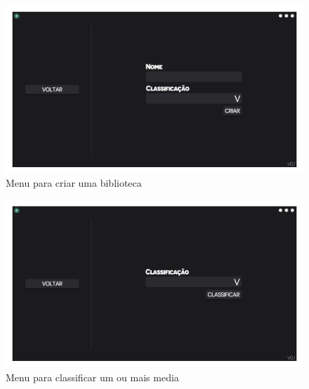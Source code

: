 \documentclass[a4paper]{report}
\begin{document}
\begin{figure}[H]
	\centering 
    \includegraphics[width=\textwidth]{images/Criar_Biblioteca_Menu.png}  
    \caption{Menu para criar uma biblioteca}
\end{figure}

\begin{figure}[H]
	\centering 
    \includegraphics[width=\textwidth]{images/Classificar_Menu.png}  
    \caption{Menu para classificar um ou mais media}
\end{figure}
\end{document}
